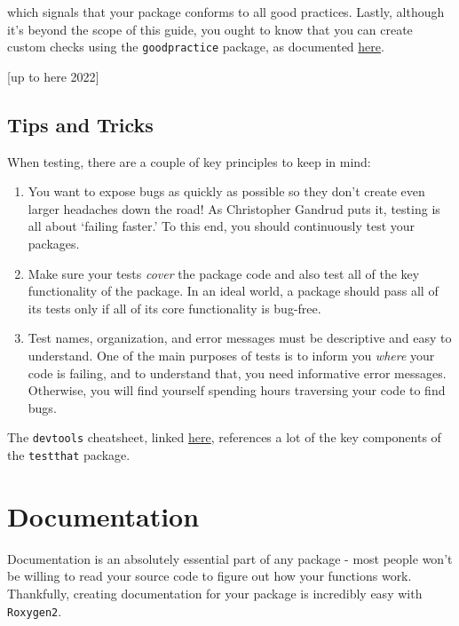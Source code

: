 \documentclass[
]{book}
\providecommand{\tightlist}{%
  \setlength{\itemsep}{0pt}\setlength{\parskip}{0pt}}
\begin{document}
which signals that your package conforms to all good practices. Lastly, although it's beyond the scope of this guide, you ought to know that you can create custom checks using the \texttt{goodpractice} package, as documented \href{https://github.com/MangoTheCat/goodpractice/blob/master/vignettes/custom_checks.Rmd}{here}.

{[}up to here 2022{]}

\hypertarget{tips-and-tricks}{%
\subsection{Tips and Tricks}\label{tips-and-tricks}}

When testing, there are a couple of key principles to keep in mind:

\begin{enumerate}
\def\labelenumi{\arabic{enumi}.}
\tightlist
\item
  You want to expose bugs as quickly as possible so they don't create even larger headaches down the road! As Christopher Gandrud puts it, testing is all about `failing faster.' To this end, you should continuously test your packages.
\item
  Make sure your tests \emph{cover} the package code and also test all of the key functionality of the package. In an ideal world, a package should pass all of its tests only if all of its core functionality is bug-free.
\item
  Test names, organization, and error messages must be descriptive and easy to understand. One of the main purposes of tests is to inform you \emph{where} your code is failing, and to understand that, you need informative error messages. Otherwise, you will find yourself spending hours traversing your code to find bugs.
\end{enumerate}

The \texttt{devtools} cheatsheet, linked \href{https://www.rstudio.com/wp-content/uploads/2015/03/devtools-cheatsheet.pdf}{here}, references a lot of the key components of the \texttt{testthat} package.

\hypertarget{documentation}{%
\section{Documentation}\label{documentation}}

Documentation is an absolutely essential part of any package - most people won't be willing to read your source code to figure out how your functions work. Thankfully, creating documentation for your package is incredibly easy with \texttt{Roxygen2}.
\end{document}
